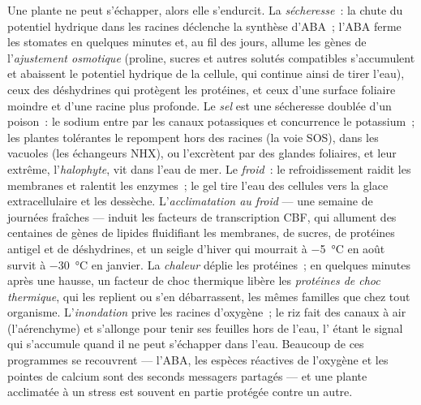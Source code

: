 \begin{definition}\label{def:b3:plant-molecular-physiology:abiotic}
Une plante ne peut s'échapper, alors elle s'endurcit. La
\emph{sécheresse}~: la chute du potentiel hydrique dans les racines
déclenche la synthèse d'ABA~; l'ABA ferme les stomates en quelques
minutes et, au fil des jours, allume les gènes de l'\emph{ajustement
osmotique} (proline, sucres et autres solutés compatibles s'accumulent
et abaissent le potentiel hydrique de la cellule, qui continue ainsi de
tirer l'eau), ceux des déshydrines qui protègent les protéines, et ceux
d'une surface foliaire moindre et d'une racine plus profonde. Le
\emph{sel} est une sécheresse doublée d'un poison~: le sodium entre par
les canaux potassiques et concurrence le potassium~; les plantes
tolérantes le repompent hors des racines (la voie SOS), dans les
vacuoles (les échangeurs NHX), ou l'excrètent par des glandes foliaires,
et leur extrême, l'\emph{halophyte}, vit dans l'eau de mer. Le
\emph{froid}~: le refroidissement raidit les membranes et ralentit les
enzymes~; le gel tire l'eau des cellules vers la glace extracellulaire
et les dessèche. L'\emph{acclimatation au froid} --- une semaine de
journées fraîches --- induit les facteurs de transcription CBF, qui
allument des centaines de gènes de lipides fluidifiant les membranes, de
sucres, de protéines antigel et de déshydrines, et un seigle d'hiver qui
mourrait à \qty{-5}{\celsius} en août survit à \qty{-30}{\celsius} en
janvier. La \emph{chaleur} déplie les protéines~; en quelques minutes
après une hausse, un facteur de choc thermique libère les \emph{protéines
de choc thermique},  qui les replient ou s'en débarrassent, les
mêmes familles que chez tout organisme. L'\emph{inondation} prive les
racines d'oxygène~; le riz fait des canaux à air (l'aérenchyme) et
s'allonge pour tenir ses feuilles hors de l'eau, l' étant le
signal qui s'accumule quand il ne peut s'échapper dans l'eau. Beaucoup
de ces programmes se recouvrent --- l'ABA, les espèces réactives de
l'oxygène et les pointes de calcium sont des seconds messagers partagés
--- et une plante acclimatée à un stress est souvent en partie protégée
contre un autre.
\end{definition}

